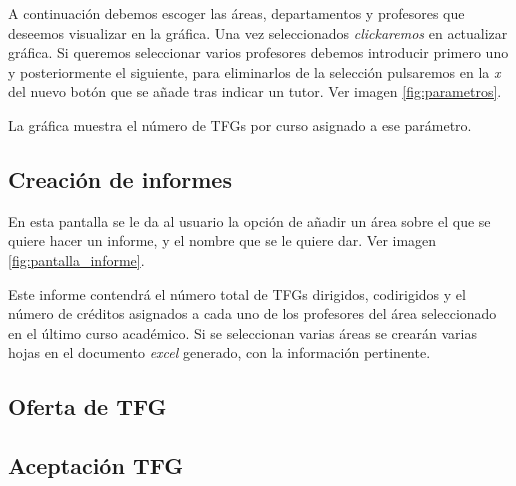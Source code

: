 
A continuación debemos escoger las áreas, departamentos y profesores que deseemos visualizar en la gráfica. Una vez seleccionados \emph{clickaremos} en actualizar gráfica.
Si queremos seleccionar varios profesores debemos introducir primero uno y posteriormente el siguiente, para eliminarlos de la selección pulsaremos en la \emph{x} del nuevo botón que se añade tras indicar un tutor. Ver imagen \ref{fig:parametros}.


La gráfica muestra el número de TFGs por curso asignado a ese parámetro. %


\subsection{Creación de informes}
En esta pantalla se le da al usuario la opción de añadir un área sobre el que se quiere hacer un informe, y el nombre que se le quiere dar. Ver imagen \ref{fig:pantalla_informe}.


Este informe contendrá el número total de TFGs dirigidos, codirigidos y el número de créditos asignados a cada uno de los profesores del área seleccionado en el último curso académico. Si se seleccionan varias áreas se crearán varias hojas en el documento \emph{excel} generado, con la información pertinente.

\subsection{Oferta de TFG}
\subsection{Aceptación TFG}


